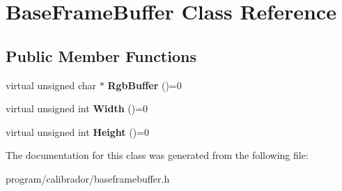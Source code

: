 \hypertarget{classBaseFrameBuffer}{}\section{Base\+Frame\+Buffer Class Reference}
\label{classBaseFrameBuffer}
\subsection*{Public Member Functions}
\begin{DoxyCompactItemize}
\item 
virtual unsigned char $\ast$ {\bfseries Rgb\+Buffer} ()=0\hypertarget{classBaseFrameBuffer_a5298587487698b06e800c2c29d45d55b}{}\label{classBaseFrameBuffer_a5298587487698b06e800c2c29d45d55b}

\item 
virtual unsigned int {\bfseries Width} ()=0\hypertarget{classBaseFrameBuffer_a91ba4d0d70c82611315b7815fe8278b7}{}\label{classBaseFrameBuffer_a91ba4d0d70c82611315b7815fe8278b7}

\item 
virtual unsigned int {\bfseries Height} ()=0\hypertarget{classBaseFrameBuffer_a3c48fd459a2578a4d494721897e5ab5f}{}\label{classBaseFrameBuffer_a3c48fd459a2578a4d494721897e5ab5f}

\end{DoxyCompactItemize}


The documentation for this class was generated from the following file\+:\begin{DoxyCompactItemize}
\item 
program/calibrador/baseframebuffer.\+h\end{DoxyCompactItemize}
